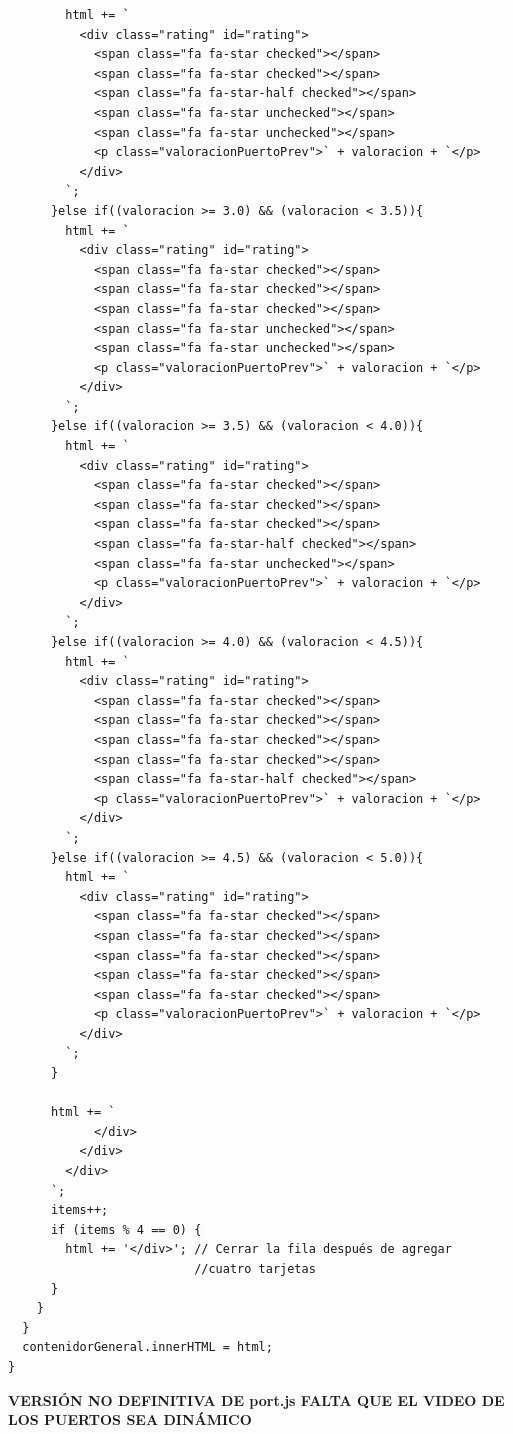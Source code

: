 \documentclass{article}
\begin{document}
\begin{itemize}
\begin{verbatim}
        html += `
          <div class="rating" id="rating">
            <span class="fa fa-star checked"></span>
            <span class="fa fa-star checked"></span>
            <span class="fa fa-star-half checked"></span>
            <span class="fa fa-star unchecked"></span>
            <span class="fa fa-star unchecked"></span>
            <p class="valoracionPuertoPrev">` + valoracion + `</p>
          </div>
        `;
      }else if((valoracion >= 3.0) && (valoracion < 3.5)){
        html += `
          <div class="rating" id="rating">
            <span class="fa fa-star checked"></span>
            <span class="fa fa-star checked"></span>
            <span class="fa fa-star checked"></span>
            <span class="fa fa-star unchecked"></span>
            <span class="fa fa-star unchecked"></span>
            <p class="valoracionPuertoPrev">` + valoracion + `</p>
          </div>
        `;
      }else if((valoracion >= 3.5) && (valoracion < 4.0)){
        html += `
          <div class="rating" id="rating">
            <span class="fa fa-star checked"></span>
            <span class="fa fa-star checked"></span>
            <span class="fa fa-star checked"></span>
            <span class="fa fa-star-half checked"></span>
            <span class="fa fa-star unchecked"></span>
            <p class="valoracionPuertoPrev">` + valoracion + `</p>
          </div>
        `;
      }else if((valoracion >= 4.0) && (valoracion < 4.5)){
        html += `
          <div class="rating" id="rating">
            <span class="fa fa-star checked"></span>
            <span class="fa fa-star checked"></span>
            <span class="fa fa-star checked"></span>
            <span class="fa fa-star checked"></span>
            <span class="fa fa-star-half checked"></span>
            <p class="valoracionPuertoPrev">` + valoracion + `</p>
          </div>
        `;
      }else if((valoracion >= 4.5) && (valoracion < 5.0)){
        html += `
          <div class="rating" id="rating">
            <span class="fa fa-star checked"></span>
            <span class="fa fa-star checked"></span>
            <span class="fa fa-star checked"></span>
            <span class="fa fa-star checked"></span>
            <span class="fa fa-star checked"></span>
            <p class="valoracionPuertoPrev">` + valoracion + `</p>
          </div>
        `;
      }

      html += `
            </div>
          </div>
        </div>
      `;
      items++;
      if (items % 4 == 0) {
        html += '</div>'; // Cerrar la fila después de agregar 
                          //cuatro tarjetas
      }
    }
  }
  contenidorGeneral.innerHTML = html;
}
    \end{verbatim}
\end{itemize}
\textbf{VERSIÓN NO DEFINITIVA DE port.js FALTA QUE EL VIDEO DE LOS PUERTOS SEA DINÁMICO}
\end{document}
